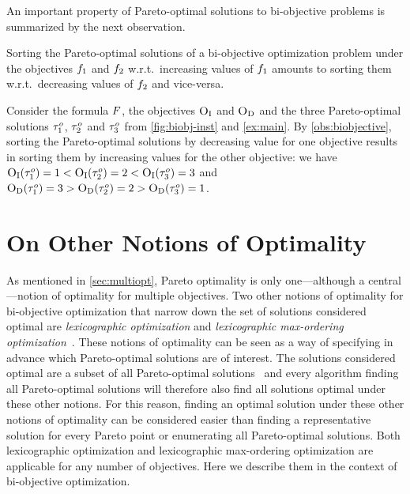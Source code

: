 An important property of Pareto-optimal solutions to bi-objective problems is summarized by the next observation.
\begin{observation} \label{obs:biobjective}
  Sorting the Pareto-optimal solutions of a bi-objective optimization problem under the objectives $f_1$ and $f_2$ w.r.t.\ increasing values of $f_1$ amounts to sorting them w.r.t.\ decreasing values of $f_2$ and vice-versa.
\end{observation}

\begin{example}
  Consider the formula $F$, the objectives $\textsc{O}_{\text{I}}$ and $\textsc{O}_{\text{D}}$ and the three Pareto-optimal solutions $\tau^o_1$, $\tau^o_2$ and $\tau^o_3$ from \cref{fig:biobj-inst} and \cref{ex:main}.
  By \cref{obs:biobjective}, sorting the Pareto-optimal solutions by decreasing value for one objective results in sorting them by increasing values for the other objective:
  we have $\textsc{O}_{\text{I}}(\tau^o_1) = 1 < \textsc{O}_{\text{I}}(\tau^o_2) = 2 < \textsc{O}_{\text{I}}(\tau^o_3) = 3$ and $\textsc{O}_{\text{D}}(\tau^o_1) = 3 > \textsc{O}_{\text{D}}(\tau^o_2) = 2 > \textsc{O}_{\text{D}}(\tau^o_3) = 1$.
\end{example}

\section{On Other Notions of Optimality\label{sec:other-notions}}

As mentioned in \cref{sec:multiopt}, Pareto optimality is only one---although a central---notion of optimality for multiple objectives.
Two other notions of optimality for bi-objective optimization that narrow down the set of solutions considered optimal are \emph{lexicographic optimization} and \emph{lexicographic max-ordering optimization}~\autocite{Ehrgott2005-5}.
These notions of optimality can be seen as a way of specifying in advance which Pareto-optimal solutions are of interest.
The solutions considered optimal are a subset of all Pareto-optimal solutions~\autocite{Ehrgott2005-5} and every algorithm finding all Pareto-optimal solutions will therefore also find all solutions optimal under these other notions.
For this reason, finding an optimal solution under these other notions of optimality can be considered easier than finding a representative solution for every Pareto point or enumerating all Pareto-optimal solutions.
Both lexicographic optimization and lexicographic max-ordering optimization are applicable for any number of objectives.
Here we describe them in the context of bi-objective optimization.


